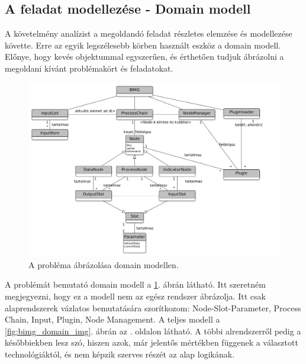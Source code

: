\documentclass[a4paper,12pt,oneside]{report}
\begin{document}
\subsection{A feladat modellezése - Domain modell}
A követelmény analízist a megoldandó feladat részletes elemzése és modellezése követte. Erre az egyik legszélesebb körben használt eszköz a domain modell. Előnye, hogy kevés objektummal egyszerűen, és érthetően tudjuk ábrázolni a megoldani kívánt problémakört és feladatokat.\cite{book:usecase_book_brief}
\begin{center}
\begin{figure}[h]
  \includegraphics[width=1.1\textwidth]{domain_real_gray.png}
  \caption{A probléma ábrázolása domain modellen. }

  \label{fig:bimg_domain_realworld_img}
\end{figure}
\end{center}
A problémát bemutató domain modell a \ref{fig:bimg_domain_realworld_img}. ábrán látható. Itt szeretném megjegyezni, hogy ez a modell nem az egész rendszer ábrázolja. Itt csak alaprendszerek vázlatos bemutatására szorítkozom: Node-Slot-Parameter, Process Chain, Input, Plugin, Node Management. A teljes modell a \ref{fig:bimg_domain_img}. ábrán az \pageref{fig:bimg_domain_img}. oldalon látható. A többi alrendszerről pedig a későbbiekben lesz szó, hiszen azok, már jelentős mértékben függenek a választott technológiáktól, és nem képzik szerves részét az alap logikának.
\end{document}
